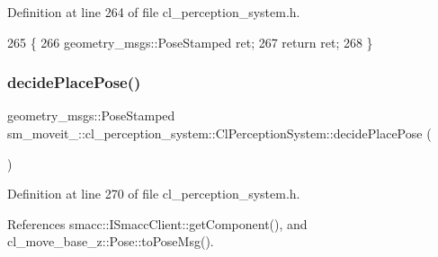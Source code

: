 Definition at line 264 of file cl\+\_\+perception\+\_\+system.\+h.


\begin{DoxyCode}
265             \{
266                 geometry\_msgs::PoseStamped ret;
267                 \textcolor{keywordflow}{return} ret;
268             \}
\end{DoxyCode}
\mbox{\label{classsm__moveit__4_1_1cl__perception__system_1_1ClPerceptionSystem_ab2431f4f2f48fc474e7b2f868bdec60d}} 
\subsubsection{\texorpdfstring{decide\+Place\+Pose()}{decidePlacePose()}}
{\footnotesize\ttfamily geometry\+\_\+msgs\+::\+Pose\+Stamped sm\+\_\+moveit\+\_\+::cl\+\_\+perception\+\_\+system\+::\+Cl\+Perception\+System\+::decide\+Place\+Pose (\begin{DoxyParamCaption}{ }\end{DoxyParamCaption})\hspace{0.3cm}{\ttfamily [inline]}}



Definition at line 270 of file cl\+\_\+perception\+\_\+system.\+h.



References smacc\+::\+I\+Smacc\+Client\+::get\+Component(), and cl\+\_\+move\+\_\+base\+\_\+z\+::\+Pose\+::to\+Pose\+Msg().


